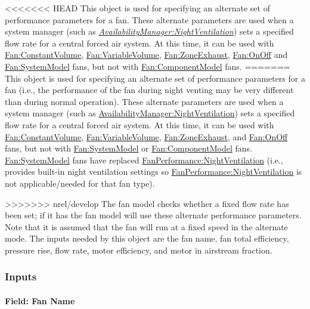 <<<<<<< HEAD
This object is used for specifying an alternate set of performance parameters for a fan.
These alternate parameters are used when a system manager (such as \emph{\hyperref[availabilitymanagernightventilation]{AvailabilityManager:NightVentilation}}) sets a specified flow rate for a central forced air system.
At this time, it can be used with \hyperref[fanconstantvolume]{Fan:ConstantVolume}, \hyperref[fanvariablevolume]{Fan:VariableVolume}, \hyperref[fanzoneexhaust]{Fan:ZoneExhaust}, \hyperref[fanonoff]{Fan:OnOff} and \hyperref[fansystemmodel]{Fan:SystemModel} fans, but not with \hyperref[fancomponentmodel]{Fan:ComponentModel} fans.
=======
This object is used for specifying an alternate set of performance parameters for a fan (i.e., the performance of the fan during night venting may be very different than during normal operation).
These alternate parameters are used when a system manager (such as \hyperref[availabilitymanagernightventilation]{AvailabilityManager:NightVentilation}) sets a specified flow rate for a central forced air system.
At this time, it can be used with \hyperref[fanconstantvolume]{Fan:ConstantVolume}, \hyperref[fanvariablevolume]{Fan:VariableVolume}, \hyperref[fanzoneexhaust]{Fan:ZoneExhaust}, and \hyperref[fanonoff]{Fan:OnOff} fans, but not with \hyperref[fansystemmodel]{Fan:SystemModel} or \hyperref[fancomponentmodel]{Fan:ComponentModel} fans.
\hyperref[fansystemmodel]{Fan:SystemModel} fans have replaced \hyperref[fanperformancenightventilation]{FanPerformance:NightVentilation} (i.e., provides built-in night ventilation settings so \hyperref[fanperformancenightventilation]{FanPerformance:NightVentilation} is not applicable/needed for that fan type).

>>>>>>> nrel/develop
The fan model checks whether a fixed flow rate has been set; if it has the fan model will use these alternate performance parameters. Note that it is assumed that the fan will run at a fixed speed in the alternate mode. The inputs needed by this object are the fan name, fan total efficiency, pressure rise, flow rate, motor efficiency, and motor in airstream fraction.

\subsubsection{Inputs}\label{inputs-4-013}

\paragraph{Field: Fan Name}\label{field-fan-name-001}

